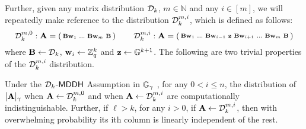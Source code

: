 Further, given any matrix distribution $\mathcal{D}_{k}$, $m \in \mathbb{N}$ and any $i \in [m]$, we will repeatedly make reference to the distribution $\mathcal{D}_k^{m,i}$, which is defined as follows: 
\[ \mathcal{D}_k^{m,0}: \mathbf{{A}} = \left(\begin{smallmatrix} \mathbf{{B}}\mathbf{w}_1 & \ldots &  
  \mathbf{{B}}\mathbf{w}_{m} & \mathbf{{B}}  \end{smallmatrix} \right)  \qquad
\mathcal{D}_k^{m,i}:\mathbf{{A}} = \left(\begin{smallmatrix} \mathbf{{B}}\mathbf{w}_1 & \ldots & \mathbf{{B}}\mathbf{w}_{i-1} 
& \mathbf{z} &  \mathbf{{B}}\mathbf{w}_{i+1} & \ldots &  
  \mathbf{{B}}\mathbf{w}_{m} & \mathbf{{B}}  \end{smallmatrix} \right) 
\]
where $\mathbf{{B}} \leftarrow \mathcal{D}_{k}$, $\mathbf{w}_i \leftarrow \mathbb{Z}_q^k$ and $\mathbf{z} \leftarrow \mathbb{G}^{k+1}$. The following are two trivial properties of the $\mathcal{D}_k^{m,i}$ distribution. 

\begin{lemma} Under the $\mathcal{D}_{k}$-$\mathsf{MDDH}$ Assumption in $\mathbb{G}_\gamma$ , for any $0 < i \leq n$, the distribution of  $[\mathbf{{A}}]_\gamma$ when $\mathbf{{A}} \leftarrow \mathcal{D}_k^{m,0}$ and when $\mathbf{{A}} \leftarrow \mathcal{D}_k^{m,i}$ are computationally indistinguishable. Further, if $\ell>k$, for any $i>0$, if $\mathbf{{A}} \leftarrow \mathcal{D}_k^{m,i}$, then with overwhelming probability its ith column is linearly independent of the rest. \label{lemma:dist-i}
\end{lemma}
